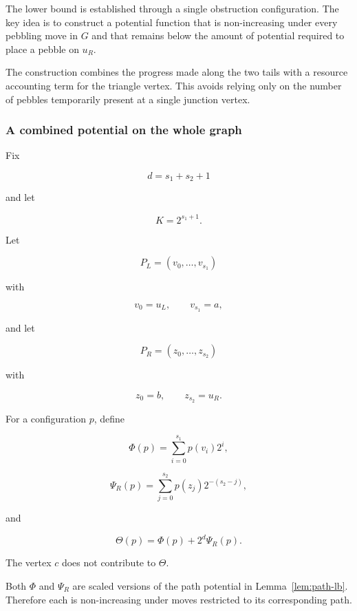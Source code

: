 

The lower bound is established through a single obstruction configuration.
The key idea is to construct a potential function that is non-increasing under
every pebbling move in $G$ and that remains below the amount of potential
required to place a pebble on $u_R$.

The construction combines the progress made along the two tails with a resource
accounting term for the triangle vertex. This avoids relying only on the number
of pebbles temporarily present at a single junction vertex.


\subsubsection{A combined potential on the whole graph}
\label{sec:b-capacity}


Fix

\[
d=s_1+s_2+1
\]

and let

\[
K=2^{s_1+1}.
\]


\begin{definition}
\label{def:theta}


Let

\[
P_L=(v_0,\ldots,v_{s_1})
\]

with

\[
v_0=u_L,\qquad v_{s_1}=a,
\]

and let

\[
P_R=(z_0,\ldots,z_{s_2})
\]

with

\[
z_0=b,\qquad z_{s_2}=u_R .
\]


For a configuration $p$, define

\[
\Phi(p)=
\sum_{i=0}^{s_1}p(v_i)2^i ,
\]

\[
\Psi_R(p)=
\sum_{j=0}^{s_2}p(z_j)2^{-(s_2-j)},
\]

and

\[
\Theta(p)=
\Phi(p)+2^d\Psi_R(p).
\]


The vertex $c$ does not contribute to $\Theta$.

\end{definition}



Both $\Phi$ and $\Psi_R$ are scaled versions of the path potential in
Lemma~\ref{lem:path-lb}. Therefore each is non-increasing under moves
restricted to its corresponding path.



